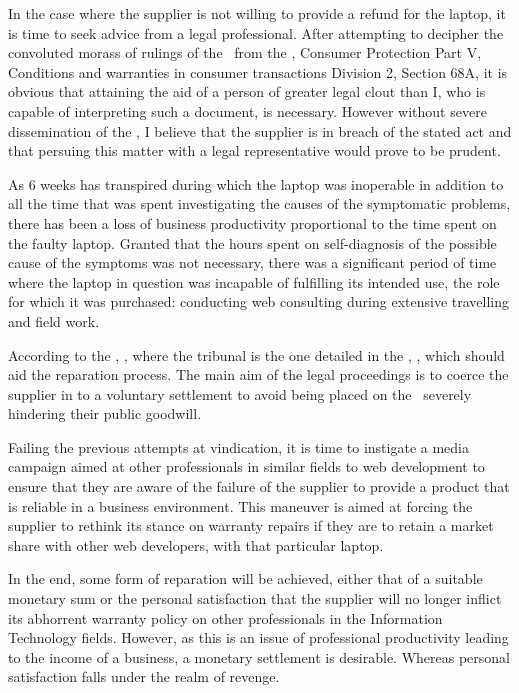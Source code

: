 In the case where the supplier is not willing to provide a refund for the laptop, it is time to seek advice from a legal professional. After attempting to decipher the convoluted morass of rulings of the \TPA\ from the \ACCC, Consumer Protection Part V, Conditions and warranties in consumer transactions Division 2, Section 68A, it is obvious that attaining the aid of a person of greater legal clout than I, who is capable of interpreting such a document, is necessary. However without severe dissemination of the \TPA, I believe that the supplier is in breach of the stated act and that persuing this matter with a legal representative would prove to be prudent.

As 6 weeks has transpired during which the laptop was inoperable in addition to all the time that was spent investigating the causes of the symptomatic problems, there has been a loss of business productivity proportional to the time spent on the faulty laptop. Granted that the hours spent on self-diagnosis of the possible cause of the symptoms was not necessary, there was a significant period of time where the laptop in question was incapable of fulfilling its intended use, the role for which it was purchased: conducting web consulting during extensive travelling and field work.

According to the \CCA, , where the tribunal is the one detailed in the \CTTTA, , which should aid the reparation process. The main aim of the legal proceedings is to coerce the supplier in to a voluntary settlement to avoid being placed on the \ severely hindering their public goodwill.

Failing the previous attempts at vindication, it is time to instigate a media campaign aimed at other professionals in similar fields to web development to ensure that they are aware of the failure of the supplier to provide a product that is reliable in a business environment. This maneuver is aimed at forcing the supplier to rethink its stance on warranty repairs if they are to retain a market share with other web developers, with that particular laptop.

In the end, some form of reparation will be achieved, either that of a suitable monetary sum or the personal satisfaction that the supplier will no longer inflict its abhorrent warranty policy on other professionals in the Information Technology fields. However, as this is an issue of professional productivity leading to the income of a business, a monetary settlement is desirable. Whereas personal satisfaction falls under the realm of revenge.


\nocite{*}   %

\bye
